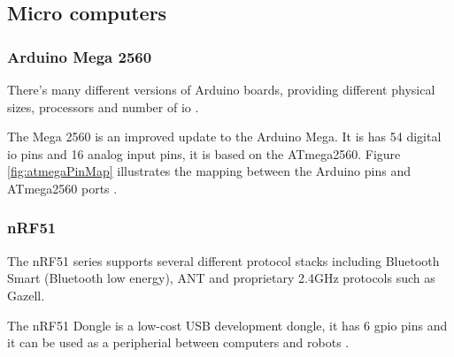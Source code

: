 \subsection{Micro computers}
\subsubsection{Arduino Mega 2560}
There's many different versions of Arduino boards, providing different physical sizes, processors and number of \acrfull{io} \cite{arduinoboards}. 

The Mega 2560 is an improved update to the Arduino Mega. It is has 54 digital \acrshort{io} pins and 16 analog input pins, it is based on the ATmega2560. Figure \ref{fig:atmegaPinMap} illustrates the mapping between the Arduino pins and ATmega2560 ports \cite{arduinomega2560}. 



\subsubsection{nRF51}
The nRF51 series supports several different protocol stacks including Bluetooth Smart (Bluetooth low energy), ANT and proprietary 2.4GHz protocols such as Gazell. 

The nRF51 Dongle is a low-cost USB development dongle, it has 6 \acrfull{gpio} pins and it can be used as a peripherial between computers and robots \cite{nrf51Dongle}.


